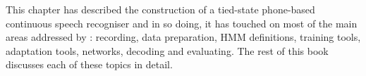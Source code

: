 This chapter has described the construction of a tied-state phone-based
continuous speech recogniser and in so doing, it has touched on most of the
main areas addressed by \HTK: recording, data preparation, HMM definitions,
training tools, adaptation tools, networks, decoding and evaluating.  The 
rest of this book discusses each of these topics in detail.



